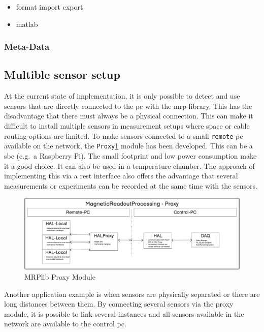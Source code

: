 \begin{itemize}
\tightlist
\item
  format import export
\item
  matlab
\end{itemize}

\hypertarget{meta-data}{%
\subsubsection{Meta-Data}\label{meta-data}}

\hypertarget{multible-sensor-setup}{%
\subsection{Multible sensor setup}\label{multible-sensor-setup}}

At the current state of implementation, it is only possible to detect
and use sensors that are directly connected to the \gls{pc} with the
\gls{mrp}-library. This has the disadvantage that there must always be a
physical connection. This can make it difficult to install multiple
sensors in measurement setups where space or cable routing options are
limited. To make sensors connected to a small
\passthrough{\lstinline!remote!} \gls{pc} available on the network, the
\passthrough{\lstinline!Proxy!}\ref{MRPlib_Proxy_Module.png} module has
been developed. This can be a \gls{sbc} (e.g.~a Raspberry Pi). The small
footprint and low power consumption make it a good choice. It can also
be used in a temperature chamber. The approach of implementing this via
a \gls{rest} interface also offers the advantage that several
measurements or experiments can be recorded at the same time with the
sensors.

\begin{figure}
\centering
\includegraphics{./generated_images/border_MRPlib_Proxy_Module.png}
\caption{MRPlib Proxy Module \label{MRPlib_Proxy_Module.png}}
\end{figure}

Another application example is when sensors are physically separated or
there are long distances between them. By connecting several sensors via
the proxy module, it is possible to link several instances and all
sensors available in the network are available to the control \gls{pc}.

